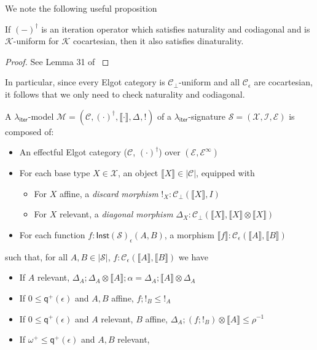 \documentclass[acmsmall,screen,review]{acmart}
\newcommand{\mc}[1]{\ensuremath{\mathcal{#1}}}
\newcommand{\ms}[1]{\ensuremath{\mathsf{#1}}}
\newcommand{\dnt}[1]{\llbracket{#1}\rrbracket}
\newcommand{\tmor}[1]{{!}_{#1}}
\newcommand{\dmor}[1]{{\Delta}_{#1}}
\newcommand{\subiterssa}{\(\lambda_{\ms{iter}}\)}
\newcommand{\zeroq}{0}
\newcommand{\cpyq}{\omega^+}
\newcommand{\alquant}{\ms{q}}
\begin{document}
We note the following useful proposition
\begin{proposition}
  If $(-)^\dagger$ is an iteration operator which satisfies naturality and codiagonal and is
  $\mc{K}$-uniform for $\mc{K}$ cocartesian, then it also satisfies dinaturality.
\end{proposition}
\begin{proof}
  See Lemma 31 of \citet{goncharov-18-guarded-traced}
\end{proof}
In particular, since every Elgot category is $\mc{C}_\bot$-uniform and all $\mc{C}_\epsilon$ are
cocartesian, it follows that we only need to check naturality and codiagonal.

\begin{definition}[\subiterssa-model]
  A \subiterssa-model $\mc{M} = (\mc{C}, (\cdot)^\dagger, \dnt{\cdot}, \dmor{}, \tmor{})$ of a
  \subiterssa-signature $\mc{S} = (\mc{X}, \mc{I}, \mc{E})$ is composed of:
  \begin{itemize}
    \item An effectful Elgot category ($\mc{C}$, $(\cdot)^\dagger$) over $(\mc{E},
    \mc{E}^\infty)$
    \item For each base type $X \in \mc{X}$, an object $\dnt{X} \in |\mc{C}|$, equipped with
    \begin{itemize}
      \item For $X$ affine, a \emph{discard morphism} $\tmor{X} : \mc{C}_\bot(\dnt{X}, I)$
      \item For $X$ relevant, a \emph{diagonal morphism} $\dmor{X} : \mc{C}_\bot(\dnt{X}, \dnt{X}
      \otimes \dnt{X})$
    \end{itemize}
    \item For each function $f : \ms{Inst}(\mc{S})_\epsilon(A, B)$, a morphism $\dnt{f} :
    \mc{C}_\epsilon(\dnt{A}, \dnt{B})$
  \end{itemize}
  such that, for all $A, B \in |\mc{S}|$, $f : \mc{C}_\epsilon(\dnt{A}, \dnt{B})$ we have
  \begin{itemize}
    \item If $A$ relevant, 
      $\dmor{A} ; \dmor{A} \otimes \dnt{A} ; \alpha = \dmor{A} ; \dnt{A} \otimes \dmor{A}$
    \item If $\zeroq \leq \alquant^+(\epsilon)$ and $A, B$ affine, $f ; !_B \leq !_A$
    \item If $\zeroq \leq \alquant^+(\epsilon)$ and $A$ relevant, $B$ affine, 
      $\dmor{A} ; (f ; !_B) \otimes \dnt{A} \leq \rho^{-1}$
    \item If $\cpyq \leq \alquant^+(\epsilon)$ and $A, B$ relevant, 

\end{itemize}
\end{definition}
\end{document}
